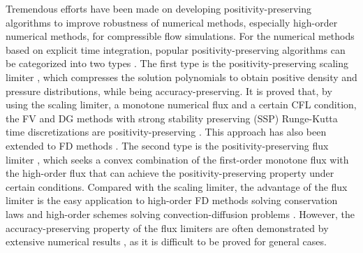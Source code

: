Tremendous efforts have been made on developing positivity-preserving algorithms to improve robustness of numerical methods, especially high-order numerical methods, for compressible flow simulations. For the numerical methods based on explicit time integration, popular positivity-preserving algorithms can be categorized into two types \cite{xu2017bound}. The first type is the positivity-preserving scaling limiter \cite{zhang2010maximum,zhang2010positivity}, which compresses the solution polynomials to obtain positive density and pressure distributions, while being accuracy-preserving. It is proved that, by using the scaling limiter, a monotone numerical flux and a certain CFL condition, the FV and DG methods with strong stability preserving (SSP) Runge-Kutta time discretizations are positivity-preserving \cite{zhang2010positivity}. This approach has also been extended to FD methods \cite{zhang2012positivity,fan2022positivity}. The second type is the positivity-preserving flux limiter \cite{hu2013positivity,christlieb2015high,kuzmin2022bound}, which seeks a convex combination of the first-order monotone flux with the high-order flux that can achieve the positivity-preserving property under certain conditions. Compared with the scaling limiter, the advantage of the flux limiter is the easy application to high-order FD methods solving conservation laws and high-order schemes solving convection-diffusion problems \cite{xu2017bound}. However, the accuracy-preserving property of the flux limiters are often demonstrated by extensive numerical results \cite{xiong2013parametrized}, as it is difficult to be proved for general cases.  


